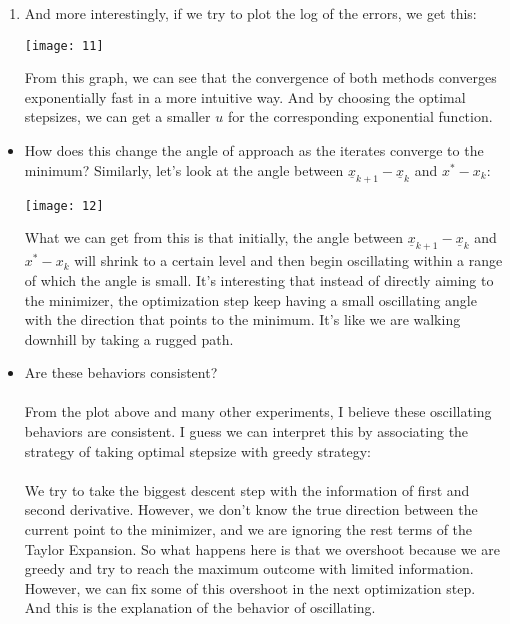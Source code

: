 \documentclass[11pt,letterpaper]{article}
\begin{document}
\newpage

\begin{tcolorbox}
    \begin{enumerate}[\quad\quad]
        \item And more interestingly, if we try to plot the log of the errors, we get this:
        \begin{center}
            \texttt{[image: 11]}
        \end{center}
        From this graph, we can see that the convergence of both methods converges exponentially fast in a more intuitive way. And by choosing the optimal stepsizes, we can get a smaller $u$ for the corresponding exponential function.
    \end{enumerate}
    \bigskip
    \begin{itemize}
        \item How does this change the angle of approach as the iterates converge to the minimum?
        Similarly, let's look at the angle between $\underline x_{k+1}-\underline x_k$ and $x^\ast - x_k$:
        \begin{center}
            \texttt{[image: 12]}
        \end{center}
        What we can get from this is that initially, the angle between $\underline x_{k+1}-\underline x_k$ and $x^\ast - x_k$ will shrink to a certain level and then begin oscillating within a range of which the angle is small. It's interesting that instead of directly aiming to the minimizer, the optimization step keep having a small oscillating angle with the direction that points to the minimum. It's like we are walking downhill by taking a rugged path.
        \bigskip
        \item Are these behaviors consistent?\\\\
        From the plot above and many other experiments, I believe these oscillating behaviors are consistent. I guess we can interpret this by associating the strategy of taking optimal stepsize with greedy strategy: 
        \\\\
        We try to take the biggest descent step with the information of first and second derivative. However, we don't know the true direction between the current point to the minimizer, and we are ignoring the rest terms of the Taylor Expansion. So what happens here is that we overshoot because we are greedy and try to reach the maximum outcome with limited information. However, we can fix some of this overshoot in the next optimization step. And this is the explanation of the behavior of oscillating.
    \end{itemize}
\end{tcolorbox}
\end{document}
